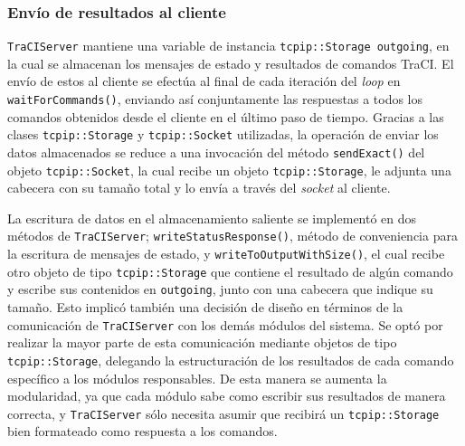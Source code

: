 %    

\subsubsection{Envío de resultados al cliente}

\texttt{TraCIServer} mantiene una variable de instancia \texttt{tcpip::Storage outgoing}, en la cual se almacenan los mensajes de estado y resultados de comandos TraCI. El envío de estos al cliente se efectúa al final de cada iteración del \emph{loop} en \texttt{waitForCommands()}, enviando así conjuntamente las respuestas a todos los comandos obtenidos desde el cliente en el último paso de tiempo. Gracias a las clases \texttt{tcpip::Storage} y \texttt{tcpip::Socket} utilizadas, la operación de enviar los datos almacenados se reduce a una invocación del método \texttt{sendExact()} del objeto \texttt{tcpip::Socket}, la cual recibe un objeto \texttt{tcpip::Storage}, le adjunta una cabecera con su tamaño total y lo envía a través del \emph{socket} al cliente.

La escritura de datos en el almacenamiento saliente se implementó en dos métodos de \texttt{TraCIServer}; \texttt{writeStatusResponse()}, método de conveniencia para la escritura de mensajes de estado, y \texttt{writeToOutputWithSize()}, el cual recibe otro objeto de tipo \texttt{tcpip::Storage} que contiene el resultado de algún comando y escribe sus contenidos en \texttt{outgoing}, junto con una cabecera que indique su tamaño. Esto implicó también una decisión de diseño en términos de la comunicación de \texttt{TraCIServer} con los demás módulos del sistema. Se optó por realizar la mayor parte de esta comunicación mediante objetos de tipo \texttt{tcpip::Storage}, delegando la estructuración de los resultados de cada comando específico a los módulos responsables. De esta manera se aumenta la modularidad, ya que cada módulo sabe como escribir sus resultados de manera correcta, y \texttt{TraCIServer} sólo necesita asumir que recibirá un \texttt{tcpip::Storage} bien formateado como respuesta a los comandos.



